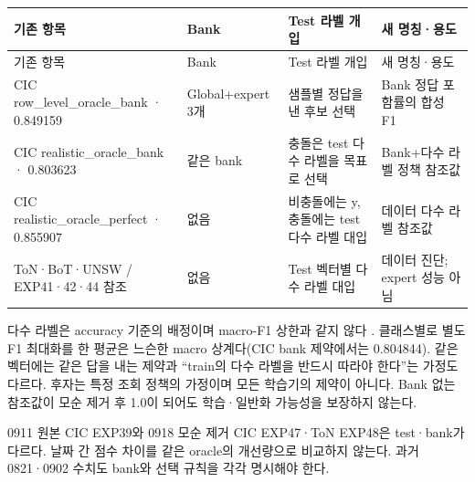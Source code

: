 \begingroup
\footnotesize
\begin{longtable}{>{\raggedright\arraybackslash}p{}>{\raggedright\arraybackslash}p{}>{\raggedright\arraybackslash}p{}>{\raggedright\arraybackslash}p{}}
\toprule
기존 항목 & Bank & Test 라벨 개입 & 새 명칭·용도 \\ \midrule
\endfirsthead
기존 항목 & Bank & Test 라벨 개입 & 새 명칭·용도 \\ \midrule
\endhead
{}CIC row\_\allowbreak{}level\_\allowbreak{}oracle\_\allowbreak{}bank · 0.849159 & Global+\allowbreak{}expert 3개 & 샘플별 정답을 낸 후보 선택 & Bank 정답 포함률의 합성 F1 \\
{}CIC realistic\_\allowbreak{}oracle\_\allowbreak{}bank · 0.803623 & 같은 bank & 충돌은 test 다수 라벨을 목표로 선택 & Bank+\allowbreak{}다수 라벨 정책 참조값 \\
{}CIC realistic\_\allowbreak{}oracle\_\allowbreak{}perfect · 0.855907 & 없음 & 비충돌에는 y, 충돌에는 test 다수 라벨 대입 & 데이터 다수 라벨 참조값 \\
{}ToN·BoT·UNSW /\allowbreak{} EXP41·42·44 참조 & 없음 & Test 벡터별 다수 라벨 대입 & 데이터 진단; expert 성능 아님 \\
\bottomrule
\end{longtable}
\endgroup
다수 라벨은 accuracy 기준의 배정이며 macro-F1 상한과 같지 않다 . 클래스별로 별도 F1 최대화를 한 평균은 느슨한 macro 상계다(CIC bank 제약에서는 0.804844). 같은 벡터에는 같은 답을 내는 제약과 “train의 다수 라벨을 반드시 따라야 한다”는 가정도 다르다. 후자는 특정 조회 정책의 가정이며 모든 학습기의 제약이 아니다. Bank 없는 참조값이 모순 제거 후 1.0이 되어도 학습·일반화 가능성을 보장하지 않는다.

0911 원본 CIC EXP39와 0918 모순 제거 CIC EXP47·ToN EXP48은 test·bank가 다르다. 날짜 간 점수 차이를 같은 oracle의 개선량으로 비교하지 않는다. 과거 0821·0902 수치도 bank와 선택 규칙을 각각 명시해야 한다.

